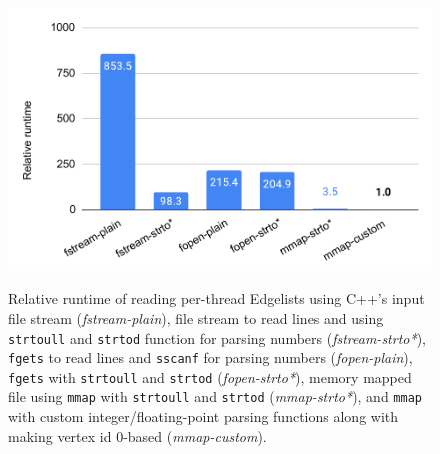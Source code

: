 \begin{figure}[hbtp]
  \centering
  \includegraphics[width=0.99\linewidth]{out/optimize-el.pdf} \\[-2ex]
  \caption{Relative runtime of reading per-thread Edgelists using C++'s input file stream (\textit{fstream-plain}), file stream to read lines and using  \texttt{strtoull} and \texttt{strtod} function for parsing numbers (\textit{fstream-strto*}), \texttt{fgets} to read lines and \texttt{sscanf} for parsing numbers (\textit{fopen-plain}), \texttt{fgets} with \texttt{strtoull} and \texttt{strtod} (\textit{fopen-strto*}), memory mapped file using \texttt{mmap} with \texttt{strtoull} and \texttt{strtod} (\textit{mmap-strto*}), and \texttt{mmap} with custom integer/floating-point parsing functions along with making vertex id 0-based (\textit{mmap-custom}).}
  \label{fig:optimize-el}
\end{figure}

